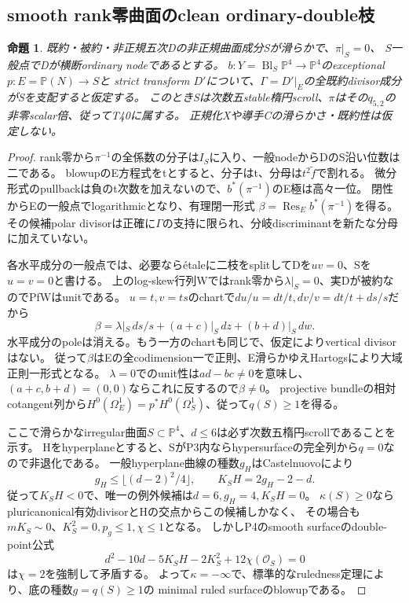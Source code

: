\documentclass[a4paper,11pt]{ltjsarticle}
\newtheorem{proposition}{命題}[section]
\theoremstyle{definition}
\begin{document}
\subsection{smooth rank零曲面のclean ordinary-double枝}
\begin{proposition}\label{prop:clean-rank-zero-T40}
既約・被約・非正規五次Dの非正規曲面成分Sが滑らかで、$\pi|_S=0$、
S一般点でDが横断ordinary nodeであるとする。
$b:Y=\operatorname{Bl}_S\mathbb P^4\to\mathbb P^4$のexceptional $p:E=\mathbb P(N)\to S$と
strict transform $D'$について、$\Gamma=D'|_E$の全既約divisor成分がSを支配すると仮定する。
このときSは次数五stable楕円scroll、$\pi$はその$q_{5,2}$の非零scalar倍、従ってT40に属する。
正規化Xや導手Cの滑らかさ・既約性は仮定しない。
\end{proposition}
\begin{proof}
rank零から$\pi^{-1}$の全係数の分子は$I_S$に入り、一般nodeからDのS沿い位数は二である。
blowupのE方程式をtとすると、分子はt、分母は$t^2\widetilde f$で割れる。
微分形式のpullbackは負のt次数を加えないので、$b^*(\pi^{-1})$のE極は高々一位。
閉性からEの一般点でlogarithmicとなり、有理閉一形式
$\beta=\operatorname{Res}_E b^*(\pi^{-1})$を得る。
その候補polar divisorは正確に$\Gamma$の支持に限られ、分岐discriminantを新たな分母に加えていない。

各水平成分の一般点では、必要ならétaleに二枝をsplitしてDを$uv=0$、Sを$u=v=0$と書ける。
上のlog-skew行列Wではrank零から$\lambda|_S=0$、実Dが被約なのでPfWはunitである。
$u=t,v=ts$のchartで$du/u=dt/t,dv/v=dt/t+ds/s$だから
\[
 \beta=\lambda|_S\,ds/s+(a+c)|_S\,dz+(b+d)|_S\,dw.
\]
水平成分のpoleは消える。もう一方のchartも同じで、仮定によりvertical divisorはない。
従って$\beta$はEの全codimension一で正則、E滑らかゆえHartogsにより大域正則一形式となる。
$\lambda=0$でのunit性は$ad-bc\ne0$を意味し、
$(a+c,b+d)=(0,0)$ならこれに反するので$\beta\ne0$。
projective bundleの相対cotangent列から$H^0(\Omega_E^1)=p^*H^0(\Omega_S^1)$、従って$q(S)\ge1$を得る。

ここで滑らかなirregular曲面$S\subset\mathbb P^4$、$d\le6$は必ず次数五楕円scrollであることを示す。
Hをhyperplaneとすると、SがP3内ならhypersurfaceの完全列から$q=0$なので非退化である。
一般hyperplane曲線の種数$g_H$はCastelnuovoにより
\[
 g_H\le\lfloor(d-2)^2/4\rfloor,\qquad K_SH=2g_H-2-d.
\]
従って$K_SH<0$で、唯一の例外候補は$d=6,g_H=4,K_SH=0$。
$\kappa(S)\ge0$ならpluricanonical有効divisorとHの交点からこの候補しかなく、
その場合も$mK_S\sim0$、$K_S^2=0,p_g\le1,\chi\le1$となる。
しかしP4のsmooth surfaceのdouble-point公式
\[
 d^2-10d-5K_SH-2K_S^2+12\chi(\mathcal O_S)=0
\]
は$\chi=2$を強制して矛盾する。
よって$\kappa=-\infty$で、標準的なruledness定理により、底の種数$g=q(S)\ge1$の
minimal ruled surfaceのblowupである。


\end{proof}
\end{document}
